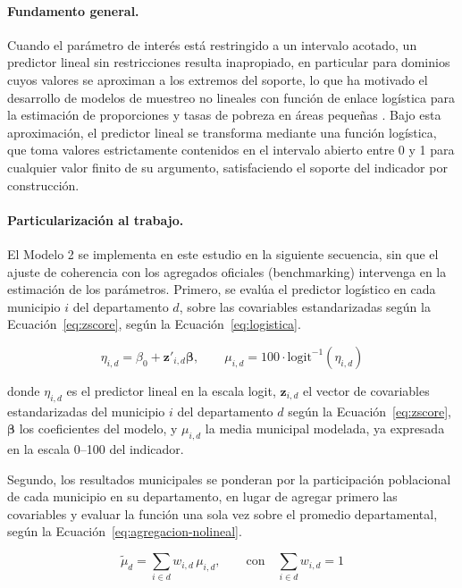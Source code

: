 \paragraph{Fundamento general.}
Cuando el parámetro de interés está restringido a un intervalo acotado, un predictor lineal sin restricciones resulta inapropiado, en particular para dominios cuyos valores se aproximan a los extremos del soporte, lo que ha motivado el desarrollo de modelos de muestreo no lineales con función de enlace logística para la estimación de proporciones y tasas de pobreza en áreas pequeñas \cite{Janicki_2020}. Bajo esta aproximación, el predictor lineal se transforma mediante una función logística, que toma valores estrictamente contenidos en el intervalo abierto entre 0 y 1 para cualquier valor finito de su argumento, satisfaciendo el soporte del indicador por construcción.

\paragraph{Particularización al trabajo.}
El Modelo 2 se implementa en este estudio en la siguiente secuencia, sin que el ajuste de coherencia con los agregados oficiales (benchmarking) intervenga en la estimación de los parámetros. Primero, se evalúa el predictor logístico en cada municipio $i$ del departamento $d$, sobre las covariables estandarizadas según la Ecuación~\ref{eq:zscore}, según la Ecuación~\ref{eq:logistica}.

\begin{equation}
    \eta_{i,d} = \beta_0 + \mathbf{z}'_{i,d}\boldsymbol{\beta}, \qquad
    \mu_{i,d} = 100 \cdot \text{logit}^{-1}(\eta_{i,d})
    \label{eq:logistica}
\end{equation}

\noindent donde $\eta_{i,d}$ es el predictor lineal en la escala logit, $\mathbf{z}_{i,d}$ el vector de covariables estandarizadas del municipio $i$ del departamento $d$ según la Ecuación~\ref{eq:zscore}, $\boldsymbol{\beta}$ los coeficientes del modelo, y $\mu_{i,d}$ la media municipal modelada, ya expresada en la escala 0--100 del indicador.

Segundo, los resultados municipales se ponderan por la participación poblacional de cada municipio en su departamento, en lugar de agregar primero las covariables y evaluar la función una sola vez sobre el promedio departamental, según la Ecuación~\ref{eq:agregacion-nolineal}.

\begin{equation}
    \tilde{\mu}_d = \sum_{i \in d} w_{i,d}\, \mu_{i,d},
    \qquad \text{con} \quad \sum_{i \in d} w_{i,d} = 1
    \label{eq:agregacion-nolineal}
\end{equation}

